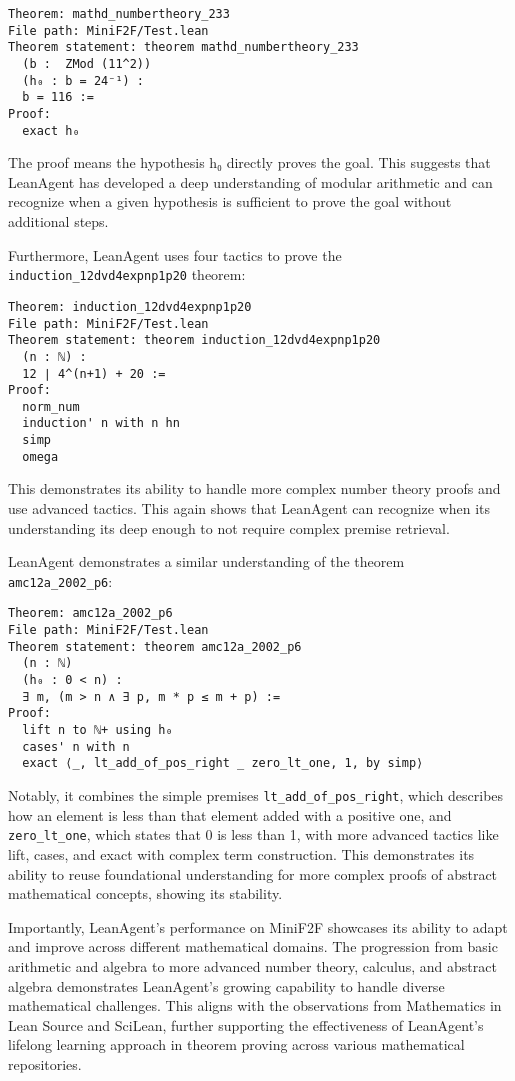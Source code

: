 \documentclass{article} %
\begin{document}
\begin{verbatim}
Theorem: mathd_numbertheory_233
File path: MiniF2F/Test.lean
Theorem statement: theorem mathd_numbertheory_233
  (b :  ZMod (11^2))
  (h₀ : b = 24⁻¹) :
  b = 116 :=
Proof:
  exact h₀
\end{verbatim}

The proof means the hypothesis h₀ directly proves the goal. This suggests that LeanAgent has developed a deep understanding of modular arithmetic and can recognize when a given hypothesis is sufficient to prove the goal without additional steps.

Furthermore, LeanAgent uses four tactics to prove the \texttt{induction\_12dvd4expnp1p20} theorem:

\begin{verbatim}
Theorem: induction_12dvd4expnp1p20
File path: MiniF2F/Test.lean
Theorem statement: theorem induction_12dvd4expnp1p20
  (n : ℕ) :
  12 ∣ 4^(n+1) + 20 :=
Proof:
  norm_num
  induction' n with n hn
  simp
  omega
\end{verbatim}

This demonstrates its ability to handle more complex number theory proofs and use advanced tactics. This again shows that LeanAgent can recognize when its understanding its deep enough to not require complex premise retrieval.

LeanAgent demonstrates a similar understanding of the theorem \texttt{amc12a\_2002\_p6}:

\begin{verbatim}
Theorem: amc12a_2002_p6
File path: MiniF2F/Test.lean
Theorem statement: theorem amc12a_2002_p6
  (n : ℕ)
  (h₀ : 0 < n) :
  ∃ m, (m > n ∧ ∃ p, m * p ≤ m + p) :=
Proof:
  lift n to ℕ+ using h₀
  cases' n with n
  exact ⟨_, lt_add_of_pos_right _ zero_lt_one, 1, by simp⟩
\end{verbatim}

Notably, it combines the simple premises \texttt{lt\_add\_of\_pos\_right}, which describes how an element is less than that element added with a positive one, and \texttt{zero\_lt\_one}, which states that 0 is less than 1, with more advanced tactics like lift, cases, and exact with complex term construction. This demonstrates its ability to reuse foundational understanding for more complex proofs of abstract mathematical concepts, showing its stability.

Importantly, LeanAgent's performance on MiniF2F showcases its ability to adapt and improve across different mathematical domains. The progression from basic arithmetic and algebra to more advanced number theory, calculus, and abstract algebra demonstrates LeanAgent's growing capability to handle diverse mathematical challenges. This aligns with the observations from Mathematics in Lean Source and SciLean, further supporting the effectiveness of LeanAgent's lifelong learning approach in theorem proving across various mathematical repositories.
\end{document}
